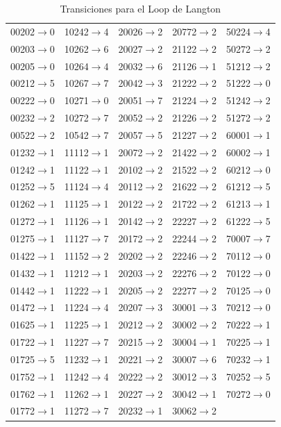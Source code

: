 \documentclass{article}
\begin{document}
\begin{table}
\begin{longtable}{| c | c | c | c | c |}
    00202$\to$0 & 10242$\to$4 & 20026$\to$2 & 20772$\to$2 & 50224$\to$4\\
    00203$\to$0 & 10262$\to$6 & 20027$\to$2 & 21122$\to$2 & 50272$\to$2\\
    00205$\to$0 & 10264$\to$4 & 20032$\to$6 & 21126$\to$1 & 51212$\to$2\\
    00212$\to$5 & 10267$\to$7 & 20042$\to$3 & 21222$\to$2 & 51222$\to$0\\
    00222$\to$0 & 10271$\to$0 & 20051$\to$7 & 21224$\to$2 & 51242$\to$2\\
    00232$\to$2 & 10272$\to$7 & 20052$\to$2 & 21226$\to$2 & 51272$\to$2\\
    00522$\to$2 & 10542$\to$7 & 20057$\to$5 & 21227$\to$2 & 60001$\to$1\\
    01232$\to$1 & 11112$\to$1 & 20072$\to$2 & 21422$\to$2 & 60002$\to$1\\
    01242$\to$1 & 11122$\to$1 & 20102$\to$2 & 21522$\to$2 & 60212$\to$0\\
    01252$\to$5 & 11124$\to$4 & 20112$\to$2 & 21622$\to$2 & 61212$\to$5\\
    01262$\to$1 & 11125$\to$1 & 20122$\to$2 & 21722$\to$2 & 61213$\to$1\\
    01272$\to$1 & 11126$\to$1 & 20142$\to$2 & 22227$\to$2 & 61222$\to$5\\
    01275$\to$1 & 11127$\to$7 & 20172$\to$2 & 22244$\to$2 & 70007$\to$7\\
    01422$\to$1 & 11152$\to$2 & 20202$\to$2 & 22246$\to$2 & 70112$\to$0\\
    01432$\to$1 & 11212$\to$1 & 20203$\to$2 & 22276$\to$2 & 70122$\to$0\\
    01442$\to$1 & 11222$\to$1 & 20205$\to$2 & 22277$\to$2 & 70125$\to$0\\
    01472$\to$1 & 11224$\to$4 & 20207$\to$3 & 30001$\to$3 & 70212$\to$0\\
    01625$\to$1 & 11225$\to$1 & 20212$\to$2 & 30002$\to$2 & 70222$\to$1\\
    01722$\to$1 & 11227$\to$7 & 20215$\to$2 & 30004$\to$1 & 70225$\to$1\\
    01725$\to$5 & 11232$\to$1 & 20221$\to$2 & 30007$\to$6 & 70232$\to$1\\
    01752$\to$1 & 11242$\to$4 & 20222$\to$2 & 30012$\to$3 & 70252$\to$5\\
    01762$\to$1 & 11262$\to$1 & 20227$\to$2 & 30042$\to$1 & 70272$\to$0\\
    01772$\to$1 & 11272$\to$7 & 20232$\to$1 & 30062$\to$2 &\\
    \hline
  \end{longtable}
  \caption{Transiciones para el Loop de Langton}
  \label{tab:langton}
\end{table}
\end{document}
